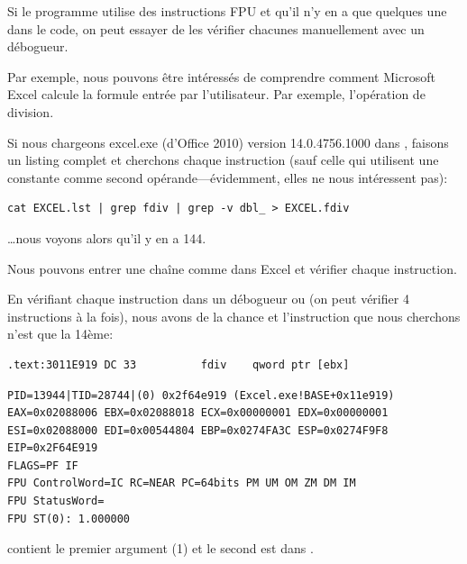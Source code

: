 
Si le programme utilise des instructions FPU et qu'il n'y en a que quelques une dans
le code, on peut essayer de les vérifier chacunes manuellement avec un débogueur.

\par Par exemple, nous pouvons être intéressés de comprendre comment Microsoft Excel
calcule la formule entrée par l'utilisateur.
Par exemple, l'opération de division.

\myindex{\GrepUsage}

Si nous chargeons excel.exe (d'Office 2010) version 14.0.4756.1000 dans \IDA, faisons
un listing complet et cherchons chaque instruction \FDIV (sauf celle qui utilisent
une constante comme second opérande---évidemment, elles ne nous intéressent pas):

\begin{lstlisting}
cat EXCEL.lst | grep fdiv | grep -v dbl_ > EXCEL.fdiv
\end{lstlisting}

\dots nous voyons alors qu'il y en a 144.

\par Nous pouvons entrer une chaîne comme  dans Excel et vérifier chaque
instruction.


\par En vérifiant chaque instruction dans un débogueur ou \tracer
(on peut vérifier 4 instructions à la fois),
nous avons de la chance et l'instruction que nous cherchons n'est que la 14ème:

\begin{lstlisting}[style=customasmx86]
.text:3011E919 DC 33          fdiv    qword ptr [ebx]
\end{lstlisting}

\begin{lstlisting}
PID=13944|TID=28744|(0) 0x2f64e919 (Excel.exe!BASE+0x11e919)
EAX=0x02088006 EBX=0x02088018 ECX=0x00000001 EDX=0x00000001
ESI=0x02088000 EDI=0x00544804 EBP=0x0274FA3C ESP=0x0274F9F8
EIP=0x2F64E919
FLAGS=PF IF
FPU ControlWord=IC RC=NEAR PC=64bits PM UM OM ZM DM IM
FPU StatusWord=
FPU ST(0): 1.000000
\end{lstlisting}

 contient le premier argument (1) et le second est dans \TT{[EBX]}.\\
\\

